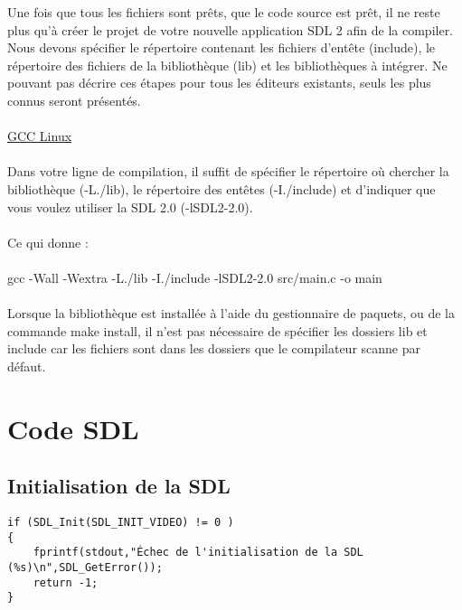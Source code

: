 \documentclass[a4paper,12pt,openany]{book}
\begin{document}
Une fois que tous les fichiers sont prêts, que le code source est prêt, il ne reste plus qu'à créer le projet de votre nouvelle application SDL 2 afin de la compiler.\\
Nous devons spécifier le répertoire contenant les fichiers d'entête (include), le répertoire des fichiers de la bibliothèque (lib) et les bibliothèques à intégrer. Ne pouvant pas décrire ces étapes pour tous les éditeurs existants, seuls les plus connus seront présentés.\\
\\
\underline{GCC Linux}\\
\\
Dans votre ligne de compilation, il suffit de spécifier le répertoire où chercher la bibliothèque (-L./lib), le répertoire des entêtes (-I./include) et d'indiquer que vous voulez utiliser la SDL 2.0 (-lSDL2-2.0).\\
\\
Ce qui donne : \\
\\
gcc -Wall -Wextra -L./lib -I./include -lSDL2-2.0 src/main.c -o main\\
\\
Lorsque la bibliothèque est installée à l'aide du gestionnaire de paquets, ou de la commande make install, il n'est pas nécessaire de spécifier les dossiers lib et include car les fichiers sont dans les dossiers que le compilateur scanne par défaut.\\


\chapter{Code SDL}
\section{Initialisation de la SDL}
\begin{verbatim}
if (SDL_Init(SDL_INIT_VIDEO) != 0 )
{
    fprintf(stdout,"Échec de l'initialisation de la SDL (%s)\n",SDL_GetError());
    return -1;
}
\end{verbatim}
\end{document}
